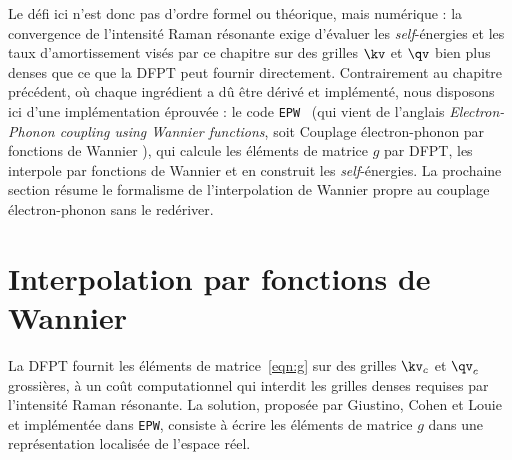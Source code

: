 Le défi ici n'est donc pas d'ordre formel ou théorique, mais numérique : la convergence de l'intensité Raman résonante exige d'évaluer les \textit{self}-énergies et les taux d'amortissement visés par ce chapitre sur des grilles $\kv$ et $\qv$ bien plus denses que ce que la DFPT peut fournir directement. Contrairement au chapitre précédent, où chaque ingrédient a dû être dérivé et implémenté, nous disposons ici d'une implémentation éprouvée : le code \texttt{EPW}~\cite{ponceEPWElectronphononCoupling2016,leeElectronPhononPhysics2023a} (qui vient de l'anglais \textit{Electron-Phonon coupling using Wannier functions}, soit \og Couplage électron-phonon par fonctions de Wannier \fg{}), qui calcule les éléments de matrice $g$ par DFPT, les interpole par fonctions de Wannier et en construit les \textit{self}-énergies. La prochaine section résume le formalisme de l'interpolation de Wannier propre au couplage électron-phonon sans le redériver.

\section{Interpolation par fonctions de Wannier}\label{sec:g_wannier}

La DFPT fournit les éléments de matrice~\eqref{eqn:g} sur des grilles $\kv_c$ et $\qv_c$ grossières, à un coût computationnel qui interdit les grilles denses requises par l'intensité Raman résonante. La solution, proposée par Giustino, Cohen et Louie~\cite{giustinoElectronphononInteractionUsing2007} et implémentée dans \texttt{EPW}, consiste à écrire les éléments de matrice $g$ dans une représentation localisée de l'espace réel.

